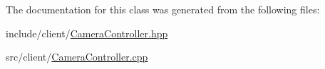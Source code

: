 The documentation for this class was generated from the following files\-:\begin{DoxyCompactItemize}
\item 
include/client/\hyperlink{CameraController_8hpp}{Camera\-Controller.\-hpp}\item 
src/client/\hyperlink{CameraController_8cpp}{Camera\-Controller.\-cpp}\end{DoxyCompactItemize}
